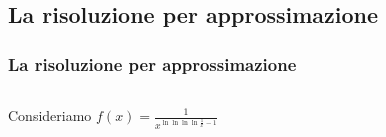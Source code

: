\documentclass{beamer}
\begin{document}
	\subsection{La risoluzione per approssimazione}
	\begin{frame}
		\frametitle{La risoluzione per approssimazione}
		\begin{columns}
			\begin{column}{0.5\textwidth}
				Consideriamo \(
					f(x) = \frac{1}{x^{\ln{\ln{\ln{\ln{\frac{1}{x}}}}}-1}}
				\)
				
				\vspace{5mm}
				
				\vspace{5mm}
			
				\vspace{5mm}
			

\end{column}
\end{columns}
\end{frame}
\end{document}
